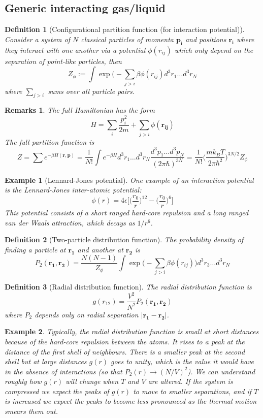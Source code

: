 \documentclass[a4paper]{article}
\newtheorem{eg}{Example}[section]
\newtheorem{remarks}{Remarks}[section]
\theoremstyle{new}
\newtheorem{defi}{Definition}[section]
\begin{document}
\subsection{Generic interacting gas/liquid}
\begin{defi}[Configurational partition function (for interaction potential)]
Consider a system of $N$ classical particles of momenta $\mathbf{p_i}$ and positions $\mathbf{r_i}$ where they interact with one another via a potential $\phi(r_{ij})$ which only depend on the separation of point-like particles, then
$$Z_\phi:=\int\exp\bigg(-\sum_{j>i}\beta\phi(r_{ij})d^3r_1\dots d^3r_N$$
where $\sum_{j>i}$ sums over all particle pairs. 
\end{defi}
\begin{remarks}
The full Hamiltonian has the form
$$H=\sum_i\frac{p_i^2}{2m}+\sum_{j>i}\phi(\mathbf{r_{ij}})$$
The full partition function is
$$Z=\sum e^{-\beta H(\mathbf{r},\mathbf{p})}=\frac{1}{N!}\int e^{-\beta H}d^3r_1\dots d^3r_N\frac{d^3p_1\dots d^3p_N}{(2\pi\hbar)^{3N}}=\frac{1}{N!}\bigg(\frac{mk_BT}{2\pi\hbar^2}\bigg)^{3N/2}Z_\phi$$
\end{remarks}
\begin{eg}[Lennard-Jones potential]
One example of an interaction potential is the Lennard-Jones inter-atomic potential:
$$\phi(r)=4\epsilon\bigg[\bigg(\frac{r_0}{r}\bigg)^{12}-\bigg(\frac{r_0}{r}\bigg)^6\bigg]$$
This potential consists of a short ranged hard-core repulsion and a long ranged van der Waals attraction, which decays as $1/r^6$.
\end{eg}
\begin{defi}[Two-particle distribution function]
The probability density of finding a particle at $\mathbf{r_1}$ and another at $\mathbf{r_2}$ is
$$P_2(\mathbf{r_1},\mathbf{r_2})=\frac{N(N-1)}{Z_\phi}\int\exp\bigg(-\sum_{j>i}\beta\phi(r_{ij})\bigg)d^3r_3\dots d^3r_N$$
\end{defi}
\begin{defi}[Radial distribution function]
The radial distribution function is
$$g(r_{12})=\frac{V^2}{N^2}P_2(\mathbf{r_1},\mathbf{r_2})$$
where $P_2$ depends only on radial separation $|\mathbf{r_1}-\mathbf{r_2}|$.
\end{defi}
\begin{eg}
Typically, the radial distribution function is small at short distances because of the hard-core repulsion between the atoms. It rises to a peak at the distance of the first shell of neighbours. There is a smaller peak at the second shell but at large distances $g(r)$ goes to unity, which is the value it would have in the absence of interactions (so that $P_2(r)\rightarrow(N/V)^2$). We can understand roughly how $g(r)$ will change when $T$ and $V$ are altered. If the system is compressed we expect the peaks of $g(r)$ to move to smaller separations, and if $T$ is increased we expect the peaks to become less pronounced as the thermal motion smears them out.
\end{eg}
\end{document}
